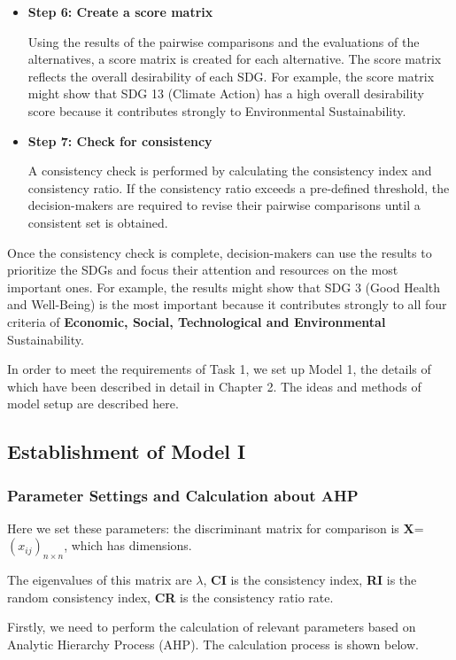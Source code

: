 \begin{itemize}
    \item \textbf{Step 6: Create a score matrix}
    
    Using the results of the pairwise comparisons and the evaluations of the alternatives, a score matrix is created for each alternative. The score matrix reflects the overall desirability of each SDG. For example, the score matrix might show that SDG 13 (Climate Action) has a high overall desirability score because it contributes strongly to Environmental Sustainability.

    \item \textbf{Step 7: Check for consistency}
    
    A consistency check is performed by calculating the consistency index and consistency ratio. If the consistency ratio exceeds a pre-defined threshold, the decision-makers are required to revise their pairwise comparisons until a consistent set is obtained.
    
\end{itemize}

Once the consistency check is complete, decision-makers can use the results to prioritize the SDGs and focus their attention and resources on the most important ones. For example, the results might show that SDG 3 (Good Health and Well-Being) is the most important because it contributes strongly to all four criteria of \textbf{Economic, Social, Technological and Environmental} Sustainability.

In order to meet the requirements of Task 1, we set up Model 1, the details of which have been described in detail in Chapter 2. The ideas and methods of model setup are described here.
\\

\subsection{Establishment of Model I}
\subsubsection{Parameter Settings and Calculation about AHP}
Here we set these parameters: the discriminant matrix for comparison is \textbf{X}=$(x_{ij})_{n \times n}$, which has dimensions. 

The eigenvalues of this matrix are $\lambda$, \textbf{CI} is the consistency index, \textbf{RI} is the random consistency index, \textbf{CR} is the consistency ratio rate.

Firstly, we need to perform the calculation of relevant parameters based on Analytic Hierarchy Process (AHP). The calculation process is shown below.

